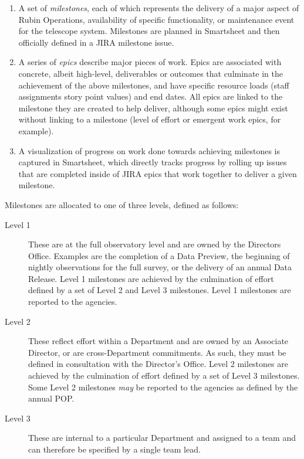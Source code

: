 \begin{enumerate}
    \item A set of \emph{milestones}, each of which represents the delivery of a major aspect of Rubin Operations, availability of specific functionality, or maintenance event for the telescope system.
        Milestones are planned in Smartsheet and then officially defined in a \gls{JIRA} milestone issue.
    \item A series of \emph{epics} describe major pieces of work.
        Epics are associated with concrete, albeit high-level, deliverables or outcomes that culminate in the achievement of the above milestones, and have specific resource loads (staff assignments story point values) and end dates.
        All epics are linked to the milestone they are created to help deliver, although some epics might exist without linking to a milestone (level of effort or emergent work epics, for example).
    \item A visualization of progress on work done towards achieving milestones is captured in Smartsheet, which directly tracks progress by rolling up issues that are completed inside of \gls{JIRA} epics that work together to deliver a given milestone.
\end{enumerate}

Milestones are allocated to one of three levels, defined as follows:

\begin{description}
\item[Level 1] These are at the full observatory level and are owned by the Directors Office.
Examples are the completion of a Data Preview, the beginning of nightly observations for the full survey, or the delivery of an annual Data Release.
Level 1 milestones are achieved by the culmination of effort defined by a set of Level 2 and Level 3 milestones.
Level 1 milestones are reported to the agencies.
\item[Level 2] These reflect effort within a Department and are owned by an Associate Director, or are cross-Department commitments.
As such, they must be defined in consultation with the Director's Office.
Level 2 milestones are achieved by the culmination of effort defined by a set of Level 3 milestones.
Some Level 2 milestones {\it may} be reported to the agencies as defined by the annual POP.
\item[Level 3] These are internal to a particular Department and assigned to a team and can therefore be specified by a single team lead.
\end{description}

